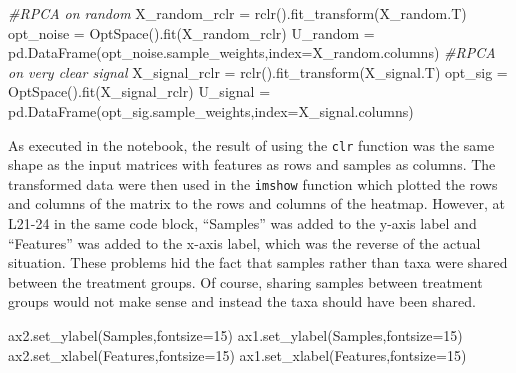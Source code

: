 \documentclass[
]{article}
\newenvironment{Shaded}{}{}
\newcommand{\CommentTok}[1]{\textcolor[rgb]{0.63,0.63,0.65}{\textit{#1}}}
\newcommand{\DecValTok}[1]{\textcolor[rgb]{0.60,0.41,0.00}{#1}}
\newcommand{\NormalTok}[1]{\textcolor[rgb]{0.22,0.23,0.26}{#1}}
\newcommand{\OperatorTok}[1]{\textcolor[rgb]{0.65,0.15,0.64}{#1}}
\newcommand{\StringTok}[1]{\textcolor[rgb]{0.31,0.63,0.31}{#1}}
\begin{document}
\begin{Shaded}
\begin{Highlighting}[numbers=left,,]
\CommentTok{\#RPCA on random}
\NormalTok{X\_random\_rclr }\OperatorTok{=}\NormalTok{ rclr().fit\_transform(X\_random.T)}
\NormalTok{opt\_noise }\OperatorTok{=}\NormalTok{ OptSpace().fit(X\_random\_rclr)}
\NormalTok{U\_random }\OperatorTok{=}\NormalTok{ pd.DataFrame(opt\_noise.sample\_weights,index}\OperatorTok{=}\NormalTok{X\_random.columns)}
\CommentTok{\#RPCA on very clear signal}
\NormalTok{X\_signal\_rclr }\OperatorTok{=}\NormalTok{ rclr().fit\_transform(X\_signal.T)}
\NormalTok{opt\_sig }\OperatorTok{=}\NormalTok{ OptSpace().fit(X\_signal\_rclr)}
\NormalTok{U\_signal }\OperatorTok{=}\NormalTok{ pd.DataFrame(opt\_sig.sample\_weights,index}\OperatorTok{=}\NormalTok{X\_signal.columns)}
\end{Highlighting}
\end{Shaded}

\normalsize{}

As executed in the notebook, the result of using the \texttt{clr}
function was the same shape as the input matrices with features as rows
and samples as columns. The transformed data were then used in the
\texttt{imshow} function which plotted the rows and columns of the
matrix to the rows and columns of the heatmap. However, at L21-24 in the
same code block, ``Samples'' was added to the y-axis label and
``Features'' was added to the x-axis label, which was the reverse of the
actual situation. These problems hid the fact that samples rather than
taxa were shared between the treatment groups. Of course, sharing
samples between treatment groups would not make sense and instead the
taxa should have been shared.

\footnotesize

\begin{Shaded}
\begin{Highlighting}[numbers=left,,firstnumber=21,]
\NormalTok{ax2.set\_ylabel(}\StringTok{\textquotesingle{}Samples\textquotesingle{}}\NormalTok{,fontsize}\OperatorTok{=}\DecValTok{15}\NormalTok{)}
\NormalTok{ax1.set\_ylabel(}\StringTok{\textquotesingle{}Samples\textquotesingle{}}\NormalTok{,fontsize}\OperatorTok{=}\DecValTok{15}\NormalTok{)}
\NormalTok{ax2.set\_xlabel(}\StringTok{\textquotesingle{}Features\textquotesingle{}}\NormalTok{,fontsize}\OperatorTok{=}\DecValTok{15}\NormalTok{)}
\NormalTok{ax1.set\_xlabel(}\StringTok{\textquotesingle{}Features\textquotesingle{}}\NormalTok{,fontsize}\OperatorTok{=}\DecValTok{15}\NormalTok{)}
\end{Highlighting}
\end{Shaded}
\end{document}
